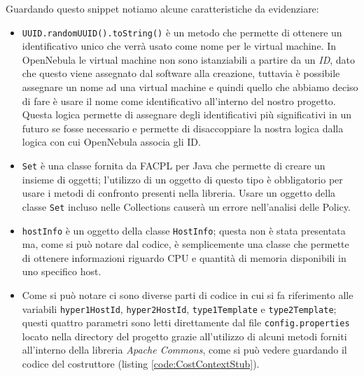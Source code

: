 Guardando questo snippet notiamo alcune caratteristiche da evidenziare:
\begin{itemize}
    \item \texttt{UUID.randomUUID().toString()} è un metodo che permette di ottenere un identificativo unico che verrà usato come nome per le virtual machine. In OpenNebula le virtual machine non sono istanziabili a partire da un \emph{ID}, dato che questo viene assegnato dal software alla creazione, tuttavia è possibile assegnare un nome ad una virtual machine e quindi quello che abbiamo deciso di fare è usare il nome come identificativo all'interno del nostro progetto. Questa logica permette di assegnare degli identificativi più significativi in un futuro se fosse necessario e permette di disaccoppiare la nostra logica dalla logica con cui OpenNebula associa gli ID.
    \item \texttt{Set} è una classe fornita da FACPL per Java che permette di creare un insieme di oggetti; l'utilizzo di un oggetto di questo tipo è obbligatorio per usare i metodi di confronto presenti nella libreria. Usare un oggetto della classe \texttt{Set} incluso nelle Collections causerà un errore nell'analisi delle Policy.
    \item \texttt{hostInfo} è un oggetto della classe \texttt{HostInfo}; questa non è stata presentata ma, come si può notare dal codice, è semplicemente una classe che permette di ottenere informazioni riguardo CPU e quantità di memoria disponibili in uno specifico host.
    \item Come si può notare ci sono diverse parti di codice in cui si fa riferimento alle variabili \texttt{hyper1HostId}, \texttt{hyper2HostId}, \texttt{type1Template} e \texttt{type2Template}; questi quattro parametri sono letti direttamente dal file \texttt{config.properties} locato nella directory del progetto grazie all'utilizzo di alcuni metodi forniti all'interno della libreria \emph{Apache Commons}\cite{apache_commons}, come si può vedere guardando il codice del costruttore (listing \ref{code:CostContextStub}).
\end{itemize}

